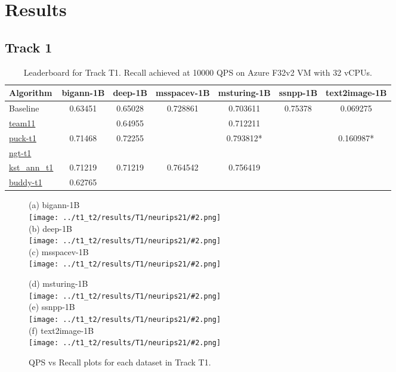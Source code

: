 
\section{Results}
\label{sec:results} 

\subsection{Track 1}

\begin{table}
  \caption{Leaderboard for Track T1. Recall achieved at 10000 QPS on Azure F32v2 VM with 32 vCPUs.}
  
  \begin{tabular}{l|c|c|c|c|c|c}
    \hline
    Algorithm & bigann-1B & deep-1B & msspacev-1B & msturing-1B & ssnpp-1B & text2image-1B  \\
    \hline
    Baseline  &	0.63451   & 0.65028 & 0.728861 & 0.703611 & 0.75378 & 0.069275       \\
    \hline
    \href{https://github.com/harsha-simhadri/big-ann-benchmarks/pull/58}{team11}     & & 0.64955 & & 0.712211 & & \\
    \href{https://github.com/harsha-simhadri/big-ann-benchmarks/pull/60}{puck-t1}    & 0.71468   & 0.72255 & & 0.793812* & & 0.160987*    \\
    \href{https://github.com/harsha-simhadri/big-ann-benchmarks/pull/66}{ngt-t1}     & & & & & & \\
    \href{https://github.com/harsha-simhadri/big-ann-benchmarks/pull/69}{kst\_ann\_t1} &	0.71219	  & 0.71219 & 0.764542 & 0.756419 & & \\
    \href{https://github.com/harsha-simhadri/big-ann-benchmarks/pull/71}{buddy-t1}   &	0.62765 & & & & \\
    \hline
  \end{tabular}
\end{table}


\newcommand{\ToneResPlot}[2]{
    \centering
    (#1) #2 \\
    \texttt{[image: ../t1\_t2/results/T1/neurips21/\#2.png]}\\
}

\begin{figure}[ht]
\begin{minipage}{0.5\linewidth}
  \ToneResPlot{a}{bigann-1B}
  \ToneResPlot{b}{deep-1B}
  \ToneResPlot{c}{msspacev-1B}
\end{minipage}%
\begin{minipage}{0.5\linewidth} 
  \ToneResPlot{d}{msturing-1B}
  \ToneResPlot{e}{ssnpp-1B}
  \ToneResPlot{f}{text2image-1B}
 \end{minipage}
  \caption{QPS vs Recall plots for each dataset in Track T1.
  }
  
\end{figure}



